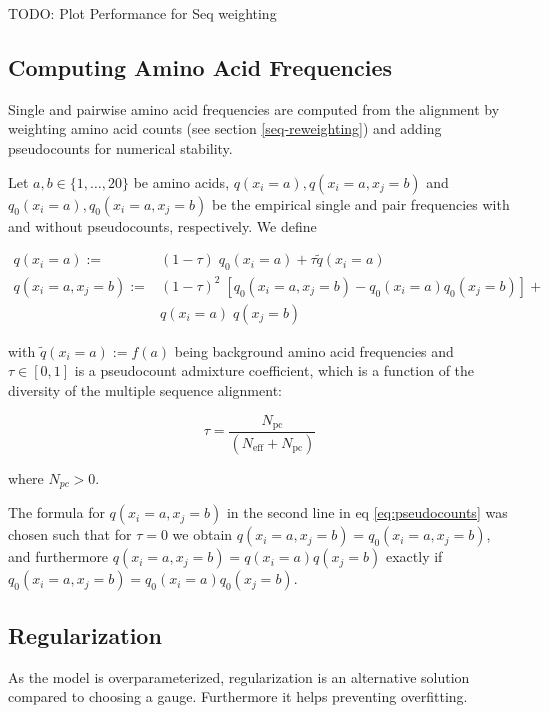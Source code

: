 \documentclass[12pt,a4paper,twoside]{book}
\newcommand{\eq}{\!=\!}
\theoremstyle{definition}
\theoremstyle{definition}
\theoremstyle{remark}
\begin{document}
TODO: Plot Performance for Seq weighting

\subsection{Computing Amino Acid
Frequencies}\label{amino-acid-frequencies}

Single and pairwise amino acid frequencies are computed from the
alignment by weighting amino acid counts (see section
\ref{seq-reweighting}) and adding pseudocounts for numerical stability.

Let \(a,b \in \{1,\ldots,20\}\) be amino acids,
\(q(x_i=a), q(x_i=a, x_j=b)\) and \(q_0(x_i=a), q_0(x_i=a,x_j=b)\) be
the empirical single and pair frequencies with and without pseudocounts,
respectively. We define

\begin{align}
    q(x_i \eq a) :=& (1-\tau) \;  q_0(x_i \eq a) + \tau \tilde{q}(x_i\eq a) \\
    q(x_i \eq a, x_j \eq b) :=& (1-\tau)^2  \; [ q_0(x_i \eq a, x_j \eq b) - q_0(x_i \eq a)  q_0(x_j \eq b) ] + \\
                            & q(x_i \eq a) \; q(x_j \eq b) 
\label{eq:pseudocounts}
\end{align}

with \(\tilde{q}(x_i \eq a) := f(a)\) being background amino acid
frequencies and \(\tau \in [0,1]\) is a pseudocount admixture
coefficient, which is a function of the diversity of the multiple
sequence alignment:

\begin{equation}
    \tau = \frac{N_\mathrm{pc}}{(N_\mathrm{eff} + N_\mathrm{pc})}
\label{eq:tau}
\end{equation}

where \(N_{pc} > 0\).

The formula for \(q(x_i \eq a, x_j \eq b)\) in the second line in eq
\eqref{eq:pseudocounts} was chosen such that for \(\tau \eq0\) we obtain
\(q(x_i \eq a, x_j \eq b) = q_0(x_i \eq a, x_j \eq b)\), and furthermore
\(q(x_i \eq a, x_j \eq b) = q(x_i \eq a) q(x_j \eq b)\) exactly if
\(q_0(x_i \eq a, x_j \eq b) = q_0(x_i \eq a) q_0(x_j \eq b)\).

\subsection{Regularization}\label{regularization}

As the model is overparameterized, regularization is an alternative
solution compared to choosing a gauge. Furthermore it helps preventing
overfitting.
\end{document}
